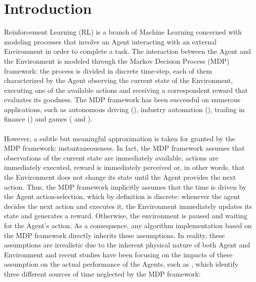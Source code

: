 \chapter{Introduction}
    Reinforcement Learning (RL) is a branch of Machine Learning concerned with modeling processes that involve an Agent interacting with an external Environment in order to complete a task. The interaction between the Agent and the Environment is modeled through the Markov Decision Process (MDP) framework: the process is divided in discrete time-step, each of them characterized by the Agent observing the current state of the Environment, executing one of the available actions and receiving a correspondent reward that evaluates its goodness. The MDP framework has been successful on numerous applications, such as autonomous driving (), industry automation (), trading in finance () and games ( and ).
    \\\\
    However, a subtle but meaningful approximation is taken for granted by the MDP framework: instantaneousness. In fact, the MDP framework assumes that observations of the current state are immediately available, actions are immediately executed, reward is immediately perceived or, in other words, that the Environment does not change its state until the Agent provides the next action. Thus, the MDP framework implicitly assumes that the time is driven by the Agent action-selection, which by definition is discrete: whenever the agent decides the next action and executes it, the Environment immediately updates its state and generates a reward. Otherwise, the environment is paused and waiting for the Agent's action. As a consequence, any algorithm implementation based on the MDP framework directly inherits these assumptions. In reality, these assumptions are irrealistic due to the inherent physical nature of both Agent and Environment and recent studies have been focusing on the impacts of these assumption on the actual performance of the Agents, such as , which identify three different sources of time neglected by the MDP framework:
